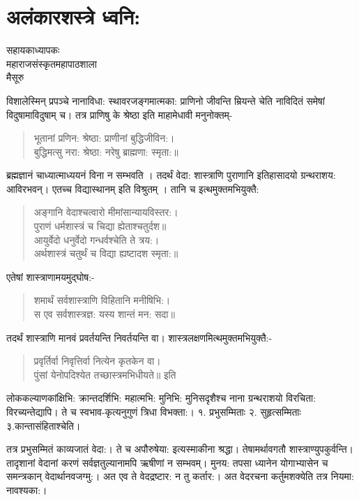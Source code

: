 \chapter{अलंकारशस्त्रे ध्वनि:}

\begin{center}
\smallskip
सहायकाध्यापकः\\
महाराजसंस्कृतमहापाठशाला\\
मैसूरु
\addrule
\end{center}
विशालेस्मिन् प्रपञ्चे नानाविधा: स्थावरजङ्गमात्मका: प्राणिनो जीवन्ति म्रियन्ते चेति नाविदितं समेषां विदुषामाविदुषाम् च। तत्र प्राणिषु के श्रेष्ठा इति माहामेधावी मनुनोक्तम्-
\begin{verse}
भूतानां प्रणिन: श्रेष्ठा: प्राणीनां बुद्धिजीविन:।\\
बुद्धिमत्सु नरा: श्रेष्ठा: नरेषु ब्राह्मणा: स्मृता:॥
\end{verse}
ब्रह्मज्ञानं चाध्यात्माध्ययनं विना न सम्भवति । तदर्थं वेदा: शास्त्राणि पुराणानि इतिहासादयो ग्रन्थराशय: आविरभवन्। एतच्च विद्यास्थानम् इति विश्रुतम् । तानि च इत्थमुक्तमभियुक्तै: 
\begin{verse}
अङ्गानि वेदाश्चत्वारो मीमांसान्यायविस्तर:।\\
पुराणं धर्मशास्त्रं च चिद्या ह्येताश्चतुर्दश॥\\
आयुर्वेदो धनुर्वेदो गन्धर्वश्चेति ते त्रय:।\\
अर्थशास्त्रं चतुर्थं च विद्या ह्यष्टादश स्मृता:॥
\end{verse}
एतेषां शास्त्राणामयमुद्घोष:-
\begin{verse}
शमार्थं सर्वशास्त्राणि विहितानि मनीषिभि:।\\
स एव सर्वशास्त्रज्ञ: यस्य शान्तं मन: सदा॥
\end{verse}
तदर्थं शास्त्राणि मानवं प्रवर्तयन्ति निवर्तयन्ति वा। शास्त्रलक्षणमित्थमुक्तमभियुक्तै:-
\begin{verse}
प्रवृर्तिर्वा निवृत्तिर्वा नित्येन कृतकेन वा।\\
पुंसां येनोपदिश्येत तच्छास्त्रमभिधीयते॥ इति
\end{verse}
लोककल्याणकांक्षिभि: क्रान्तदर्शिभि: महात्मभि: मुनिभि: मुनिसदृशैश्च नाना ग्रन्थराशयो विरचिता: विरच्यन्तेद्यापि। ते च स्वभाव-कृत्यनुगुणं त्रिधा विभक्ता:। १. प्रभुसम्मिताः   २. सुहृत्सम्मिताः  ३.कान्तासंहिताश्चेति।

तत्र प्रभुसम्मितं काव्यजातं वेदा:। ते च अपौरुषेया: इत्यस्माकीना श्रद्धा। तेषामर्थावगतौ शास्त्राण्युपकुर्वन्ति। तादृशानां वेदानां करणं सर्वज्ञतुल्यानामपि ऋषीणां न सम्भवम्। मुनय: तपसा ध्यानेन योगाभ्यासेन च समन्त्रकान् वेदार्थानवजग्मु:। अत एव ते वेदद्रष्टार: न तु कर्तार:। अत वेदरचना कर्तुमशक्येति तत्र नियमा: नावश्यका:।

